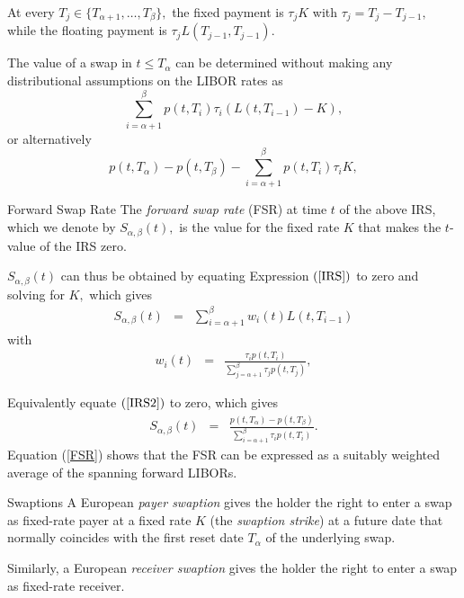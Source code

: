 	At every $T_j \in \{T_{\alpha+1},\dots,T_\beta\},$ the fixed
	payment is $\tau_j K$ with $\tau_j=T_j-T_{j-1},$ while the
	floating
	payment is $\tau_j L(T_{j-1},T_{j-1})$.

	The value of a swap in $t \leq T_\alpha$ can be determined without making
	any distributional assumptions on the LIBOR rates as
		\begin{equation}\label{IRS}
		\sum_{i=\alpha+1}^\beta p(t,T_i) \tau_i (L(t,T_{i-1})-K),
		\end{equation}
	or alternatively
		\begin{equation}
		\label{IRS2}
		p(t,T_\alpha) - p(t,T_\beta) - \sum_{i=\alpha+1}^\beta p(t,T_i) \tau_i K,
		\end{equation}


Forward Swap Rate
	The {\em forward swap rate} (FSR) at time $t$ of the above IRS,
	which we denote by $S_{\alpha,\beta}(t),$ is the value for the
	fixed rate $K$ that makes the $t$-value of the IRS zero.
 
	$S_{\alpha,\beta}(t)$ can thus be obtained by equating Expression
	$(\ref{IRS})$ to zero and solving for $K,$ which gives
		\begin{eqnarray}
		\label{FSR} S_{\alpha,\beta}(t) & = &  \sum_{i=\alpha+1}^\beta
		w_i(t) L(t,T_{i-1})
		\end{eqnarray}
	with
		\begin{eqnarray*}
		w_i(t) & = & \frac{ \tau_i p(t,T_i) }{\sum_{j=\alpha+1}^\beta
		\tau_j p(t,T_j)},
		\end{eqnarray*}

	Equivalently equate $(\ref{IRS2})$ to zero, which gives
		\begin{eqnarray*}
		S_{\alpha,\beta}(t)  &=&  \frac{ p(t,T_\alpha) - p(t, T_\beta) }{
		\sum_{i=\alpha+1}^\beta \tau_i p(t,T_i) }.
		\end{eqnarray*}
	Equation (\ref{FSR}) shows that the FSR can be expressed as a
	suitably weighted average of the spanning forward LIBORs.


Swaptions
	A European {\em payer swaption} gives the holder the right to enter a swap as
	fixed-rate payer at a fixed rate $K$ (the {\em swaption strike})
	at a future date that normally coincides with the first reset date
	$T_\alpha$ of the underlying swap.
 
	Similarly, a European {\em receiver swaption} gives the holder the right to enter a swap as
	fixed-rate receiver.
	
